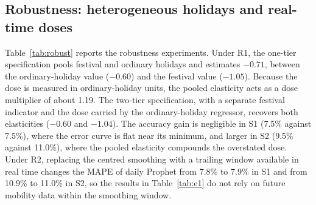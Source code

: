 \documentclass{article}
\theoremstyle{plain}
\theoremstyle{definition}
\theoremstyle{remark}
\begin{document}
\subsection{Robustness: heterogeneous holidays and real-time doses}\label{sec:robust}
Table~\ref{tab:robust} reports the robustness experiments. Under R1, the one-tier specification pools festival and ordinary holidays and estimates $-0.71$, between the ordinary-holiday value ($-0.60$) and the festival value ($-1.05$). Because the dose is measured in ordinary-holiday units, the pooled elasticity acts as a dose multiplier of about 1.19. The two-tier specification, with a separate festival indicator and the dose carried by the ordinary-holiday regressor, recovers both elasticities ($-0.60$ and $-1.04$). The accuracy gain is negligible in S1 (7.5\% against 7.5\%), where the error curve is flat near its minimum, and larger in S2 (9.5\% against 11.0\%), where the pooled elasticity compounds the overstated dose. Under R2, replacing the centred smoothing with a trailing window available in real time changes the MAPE of daily Prophet from 7.8\% to 7.9\% in S1 and from 10.9\% to 11.0\% in S2, so the results in Table~\ref{tab:e1} do not rely on future mobility data within the smoothing window.
\end{document}
